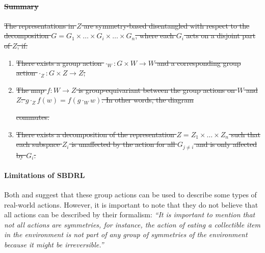 \paragraph{\sout{Summary}}
\sout{
	The representations in $Z$ are symmetry-based disentangled with respect to the decomposition $G = G_1 \times \hdots \times G_i \times \hdots \times G_n$, where each $G_i$ acts on a disjoint part of $Z$, if:
}
\begin{enumerate}
	\item \sout{There exists a group action $\cdot_{W}: G \times W \to W$ and a corresponding group action $\cdot_{Z}: G \times Z \to Z$;}
	\item \sout{The map $f : W \to Z$ is group-equivariant between the group actions on $W$ and $Z$: $g \cdot_{Z} f(w) = f(g \cdot_{W} w)$. In other words, the diagram}
	      
	      \sout{commutes.}

	\item \sout{There exists a decomposition of the representation $Z = Z_1 \times \hdots \times Z_n$ such that each subspace $Z_i$ is unaffected by the action for all $G_{j \neq i}$ and is only affected by $G_i$.}
\end{enumerate}


\paragraph{Limitations of SBDRL}
Both \cite{Higgins2018} and \cite{caselles2019symmetry} suggest that these group actions can be used to describe some types of real-world actions.
However, it is important to note that they do not believe that all actions can be described by their formalism: \textit{``It is important to mention that not all actions are symmetries, for instance, the action of eating a collectible item in the environment is not part of any group of symmetries of the environment because it might be irreversible.''}

